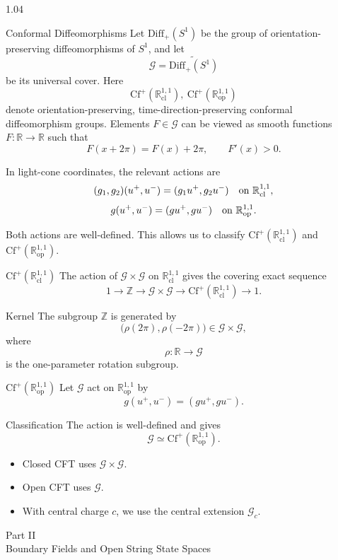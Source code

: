 \documentclass[xcolor={dvipsnames}]{beamer}
\theoremstyle{definition}
\theoremstyle{plain}
\newcommand{\MG}{\mathscr{G}}
\newcommand{\Rbb}{\mathbb{R}}
\newcommand{\Zbb}{\mathbb{Z}}
\newcommand{\cl}{\mathrm{cl}}
\newcommand{\op}{\mathrm{op}}
\newcommand{\Diff}{\mathrm{Diff}}
\newcommand{\Cf}{\mathrm{Cf}}
\newcommand{\Rcl}{\mathbb R^{1,1}_{\cl}}
\newcommand{\Rop}{\mathbb R^{1,1}_{\op}}
\newcommand{\Gc}{\MG_c}
\newcommand{\PartFrame}[2]{%
\begin{frame}
\vfill
\begin{center}
{\large\textcolor{myteal!70!black}{Part #1}}\\[.35cm]
{\LARGE\textcolor{deepblue}{#2}}
\end{center}
\vfill
\end{frame}}
\begin{document}
\begin{spacing}{1.04}
\begin{frame}[t]{Conformal Diffeomorphisms}
\footnotesize
Let $\Diff_+(S^1)$ be the group of orientation-preserving diffeomorphisms of $S^1$, and let
\[
  \MG=\widetilde{\Diff_+(S^1)}
\]
be its universal cover.
Here
\[
  \Cf^+(\Rcl),\ \Cf^+(\Rop)
\]
denote orientation-preserving, time-direction-preserving conformal diffeomorphism groups.
Elements $F\in \MG$ can be viewed as smooth functions $F:\Rbb\to\Rbb$ such that
\[
  F(x+2\pi)=F(x)+2\pi,\qquad F'(x)>0 .
\]

In light-cone coordinates, the relevant actions are
\[
  (g_1,g_2)(u^+,u^-)=(g_1u^+,g_2u^-)
  \quad\hbox{on }\Rcl,
\]
\[
  g(u^+,u^-)=(gu^+,gu^-)
  \quad\hbox{on }\Rop.
\]

Both actions are well-defined.
This allows us to classify $\Cf^+(\Rcl)$ and $\Cf^+(\Rop)$.
\end{frame}

\begin{frame}[t]{$\Cf^+(\Rcl)$}
\small
The action of $\MG\times \MG$ on $\Rcl$ gives the covering exact sequence
\[
  1\longrightarrow \Zbb\longrightarrow
  \MG\times \MG\longrightarrow \Cf^+(\Rcl)\longrightarrow 1.
\]

\begin{block}{Kernel}
The subgroup $\Zbb$ is generated by
\[
  \bigl(\rho(2\pi),\rho(-2\pi)\bigr)\in \MG\times \MG,
\]
where
\[
  \rho:\Rbb\longrightarrow \MG
\]
is the one-parameter rotation subgroup.
\end{block}

\end{frame}

\begin{frame}[t]{$\Cf^+(\Rop)$}
\small
Let $\MG$ act on $\Rop$ by
\[
  g(u^+,u^-)=(gu^+,gu^-).
\]

\begin{block}{Classification}
The action is well-defined and gives
\[
  \MG\simeq \Cf^+(\Rop).
\]
\end{block}

\begin{itemize}
  \item Closed CFT uses $\MG\times \MG$.
  \item Open CFT uses $\MG$.
  \item With central charge $c$, we use the central extension $\Gc$.
\end{itemize}
\end{frame}

\PartFrame{II}{Boundary Fields and Open String State Spaces}


\end{spacing}
\end{document}
